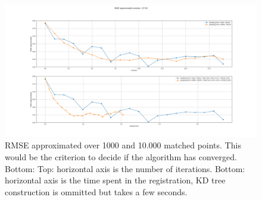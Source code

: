 \documentclass[a4paper]{article}
\begin{document}
\begin{figure}[H]
  \centering
  \includegraphics[width=1.\linewidth]{figures/RMS_APPROX_random_sampling_limit_1k_vs_10k.png}
  \caption{RMSE approximated over 1000 and  10.000 matched points. This would be the criterion to decide if the algorithm has converged. Bottom: Top: horizontal axis is the number of iterations. Bottom: horizontal axis is the time spent in the registration, KD tree construction is ommitted but takes a few seconds.}
  \label{fig:real_scene_icp}
\end{figure}
\end{document}
